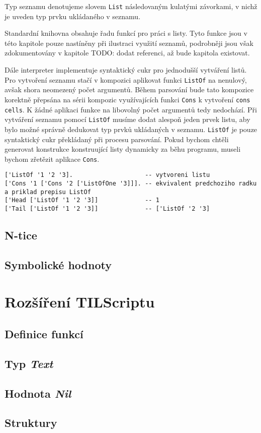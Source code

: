 Typ seznamu denotujeme slovem \lstinline{List} následovaným kulatými závorkami, v nichž je uveden
typ prvku ukládaného v seznamu.

Standardní knihovna obsahuje řadu funkcí pro práci s listy. Tyto funkce jsou v této kapitole pouze
nastíněny při ilustraci využití seznamů, podrobněji jsou však zdokumentovány v kapitole TODO: dodat
referenci, až bude kapitola existovat.

Dále interpreter implementuje syntaktický cukr pro jednodušší vytváření listů. Pro vytvoření
seznamu stačí v kompozici aplikovat funkci \lstinline{ListOf} na nenulový, avšak shora neomezený
počet argumentů. Během parsování bude tato kompozice korektně přepsána na sérii kompozic
využívajících funkci \lstinline{Cons} k vytvoření \lstinline{cons cells}. K žádné aplikaci funkce
na libovolný počet argumentů tedy nedochází. Při vytváření seznamu pomocí \lstinline{ListOf} musíme
dodat alespoň jeden prvek listu, aby bylo možné správně dedukovat typ prvků ukládaných v seznamu.
\lstinline{ListOf} je pouze syntaktický cukr překládaný při procesu parsování. Pokud bychom chtěli
generovat konstrukce konstruující listy dynamicky za běhu programu, museli bychom zřetězit aplikace
\lstinline{Cons}.

\begin{lstlisting}[caption={Příklad využití seznamů}]
['ListOf '1 '2 '3].                    -- vytvoreni listu
['Cons '1 ['Cons '2 ['ListOfOne '3]]]. -- ekvivalent predchoziho radku a priklad prepisu ListOf
['Head ['ListOf '1 '2 '3]]             -- 1
['Tail ['ListOf '1 '2 '3]]             -- ['ListOf '2 '3]
\end{lstlisting}

\subsection{N-tice}

\subsection{Symbolické hodnoty} \label{symbolic-values}

\section{Rozšíření TILScriptu}

\subsection{Definice funkcí} \label{fn-definition}

\subsection{Typ \textit{Text}} \label{text-type}

\subsection{Hodnota \textit{Nil}} \label{nil-value}

\subsection{Struktury} \label{structs}

\endinput
